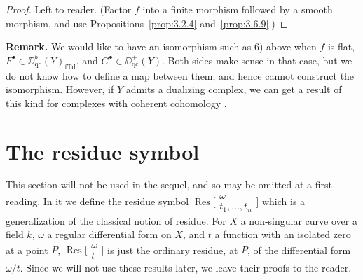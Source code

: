 \begin{proof}
Left to reader. (Factor $f$ into a finite morphism followed by a smooth morphism, and use Propositions~\ref{prop:3.2.4} and~\ref{prop:3.6.9}.)
\end{proof}

\textbf{Remark.}
We would like to have an isomorphism such as 6) above when $f$ is flat, $F^\bullet\in\DD_{\mathrm{qc}}^b(Y)_{\mathrm{fTd}}$, and $G^\bullet\in\DD_{\mathrm{qc}}^+(Y)$. Both sides make sense in that case, but we do not know how to define a map between them, and hence cannot construct the isomorphism. However, if $Y$ admits a dualizing complex, we can get a result of this kind for complexes with coherent cohomology .

\section{The residue symbol}\label{sec:3.9}

This section will not be used in the sequel, and so may be omitted at a first reading. In it we define the residue symbol $\operatorname{Res}\bigl[\begin{smallmatrix} \omega \\ t_1,\dots,t_n \end{smallmatrix}\bigr]$ which is a generalization of the classical notion of residue. For $X$ a non-singular curve over a field $k$, $\omega$ a regular differential form on $X$, and $t$ a function with an isolated zero at a point $P$, $\operatorname{Res}\bigl[\begin{smallmatrix} \omega \\ t \end{smallmatrix}\bigr]$ is just the ordinary residue, at $P$, of the differential form $\omega/t$. Since we will not use these results later, we leave their proofs to the reader.

